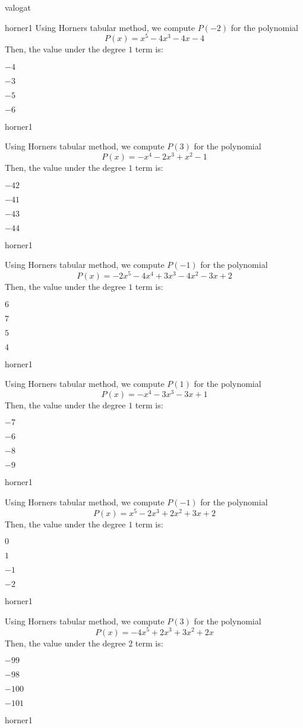 \documentclass[12pt]{article}
\begin{document}
\begin{quiz}{valogat}
\begin{multi}{horner1}
Using Horners tabular method, we compute $P(-2)$ for the polynomial
$$P(x)=x^5-4x^3-4x-4$$
Then, the value under the degree $1$ term is:
\item* $ -4 $
\item  $ -3 $
\item  $ -5 $
\item  $ -6 $
\end{multi}
\begin{multi}{horner1}

Using Horners tabular method, we compute $P(3)$ for the polynomial
$$P(x)=-x^4-2x^3+x^2-1$$
Then, the value under the degree $1$ term is:
\item* $ -42 $
\item  $ -41 $
\item  $ -43 $
\item  $ -44 $
\end{multi}
\begin{multi}{horner1}

Using Horners tabular method, we compute $P(-1)$ for the polynomial
$$P(x)=-2x^5-4x^4+3x^3-4x^2-3x+2$$
Then, the value under the degree $1$ term is:
\item* $ 6 $
\item  $ 7 $
\item  $ 5 $
\item  $ 4 $
\end{multi}
\begin{multi}{horner1}

Using Horners tabular method, we compute $P(1)$ for the polynomial
$$P(x)=-x^4-3x^3-3x+1$$
Then, the value under the degree $1$ term is:
\item* $ -7 $
\item  $ -6 $
\item  $ -8 $
\item  $ -9 $
\end{multi}
\begin{multi}{horner1}

Using Horners tabular method, we compute $P(-1)$ for the polynomial
$$P(x)=x^5-2x^3+2x^2+3x+2$$
Then, the value under the degree $1$ term is:
\item* $ 0 $
\item  $ 1 $
\item  $ -1 $
\item  $ -2 $
\end{multi}
\begin{multi}{horner1}

Using Horners tabular method, we compute $P(3)$ for the polynomial
$$P(x)=-4x^5+2x^3+3x^2+2x$$
Then, the value under the degree $2$ term is:
\item* $ -99 $
\item  $ -98 $
\item  $ -100 $
\item  $ -101 $
\end{multi}
\begin{multi}{horner1}


\end{multi}
\end{quiz}
\end{document}

